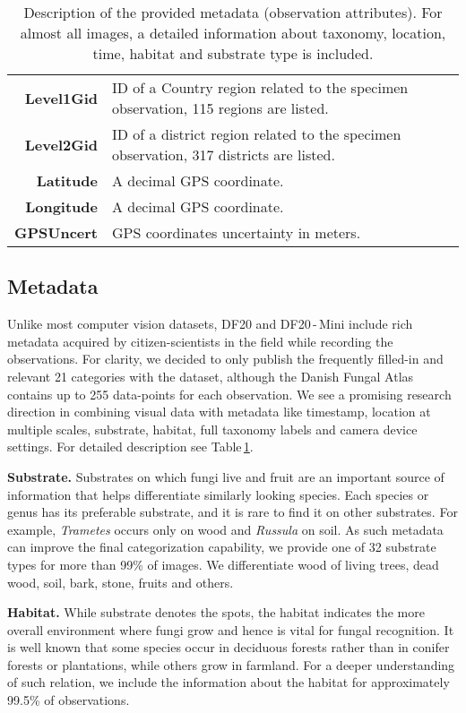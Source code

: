\documentclass[10pt,twocolumn,letterpaper]{article}
\begin{document}
\begin{table}[tbh]
\begin{center}
\begin{tabular}{| r  p{6.0cm}@{\hskip 5pt}  |}
\small{\textbf{Level1Gid}} & \small{ID of a Country region related to the specimen observation, 115 regions are listed.} \\
\small{\textbf{Level2Gid}} & \small{ID of a district region related to the specimen observation, 317 districts are listed.} \\
        \small{\textbf{Latitude}} & \small{A decimal GPS coordinate.} \\
        \small{\textbf{Longitude}} & \small{A decimal GPS coordinate.} \\
        \small{\textbf{GPSUncert}} & \small{GPS coordinates uncertainty in meters.} \\
\hline
\end{tabular}
\end{center}
\caption{Description of the provided metadata (observation attributes). For almost all images, a detailed information about taxonomy, location, time, habitat and substrate type is included.}
\label{table:metadata}
\end{table}


\subsection{Metadata}
Unlike most computer vision datasets, DF20 and DF20\,-\,Mini include rich metadata acquired by citizen-scientists in the field while recording the observations. For clarity, we decided to only publish the frequently filled-in and relevant 21 categories with the dataset, although the Danish Fungal Atlas contains up to 255 data-points for each observation. We see a promising research direction in combining visual data with metadata like timestamp, location at multiple scales, substrate, habitat, full taxonomy labels and camera device settings. For detailed description see Table\,\ref{table:metadata}. 

\textbf{Substrate.} Substrates on which fungi live and fruit are an important source of information that helps differentiate similarly looking species. Each species or genus has its preferable substrate, and it is rare to find it on other substrates. For example, \textit{Trametes} occurs only on wood and \textit{Russula} on soil. As such metadata can improve the final categorization capability, we provide one of 32 substrate types for more than 99\% of images. We differentiate wood of living trees, dead wood, soil, bark, stone, fruits and others. 

\textbf{Habitat.} While substrate denotes the spots, the habitat indicates the more overall environment where fungi grow and hence is vital for fungal recognition. It is well known that some species occur in deciduous forests rather than in conifer forests or plantations, while others grow in farmland. For a deeper understanding of such relation, we include the information about the habitat for approximately 99.5\% of observations.
\end{document}
